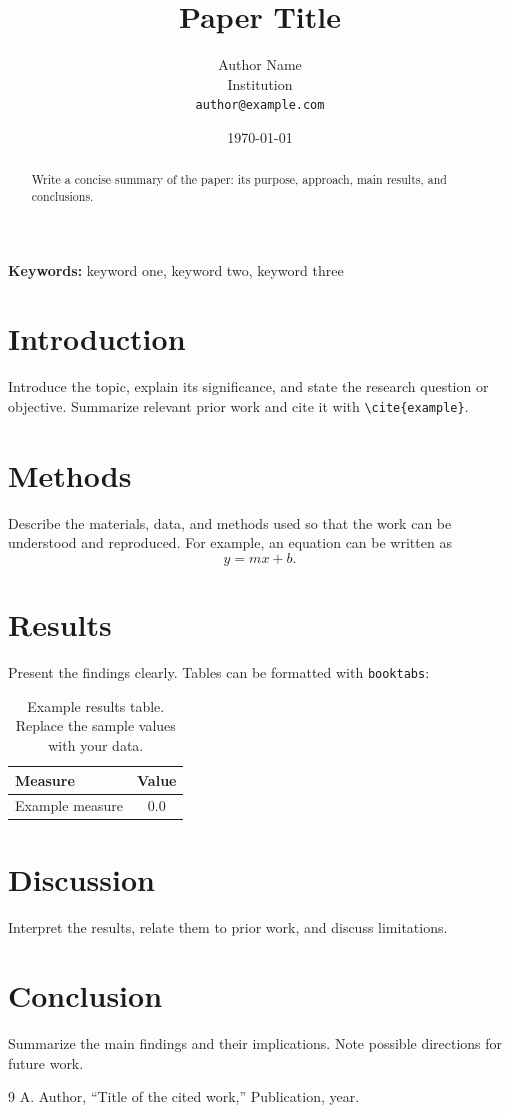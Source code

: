 \documentclass[11pt]{article}
\title{Paper Title}
\author{Author Name\\
  \small Institution\\
  \small \texttt{author@example.com}}
\date{\today}
\begin{document}
\maketitle

\begin{abstract}
Write a concise summary of the paper: its purpose, approach, main results, and
conclusions.
\end{abstract}

\noindent\textbf{Keywords:} keyword one, keyword two, keyword three

\section{Introduction}
Introduce the topic, explain its significance, and state the research question
or objective. Summarize relevant prior work and cite it with
\verb|\cite{example}|.

\section{Methods}
Describe the materials, data, and methods used so that the work can be
understood and reproduced. For example, an equation can be written as
\begin{equation}
  y = mx + b.
\end{equation}

\section{Results}
Present the findings clearly. Tables can be formatted with \texttt{booktabs}:
\begin{table}[ht]
  \centering
  \caption{Example results table. Replace the sample values with your data.}
  \label{tab:example}
  \begin{tabular}{lc}
    \toprule
    Measure & Value \\
    \midrule
    Example measure & 0.0 \\
    \bottomrule
  \end{tabular}
\end{table}

\section{Discussion}
Interpret the results, relate them to prior work, and discuss limitations.

\section{Conclusion}
Summarize the main findings and their implications. Note possible directions
for future work.

\begin{thebibliography}{9}
A. Author, ``Title of the cited work,'' Publication, year.
\end{thebibliography}
\end{document}
